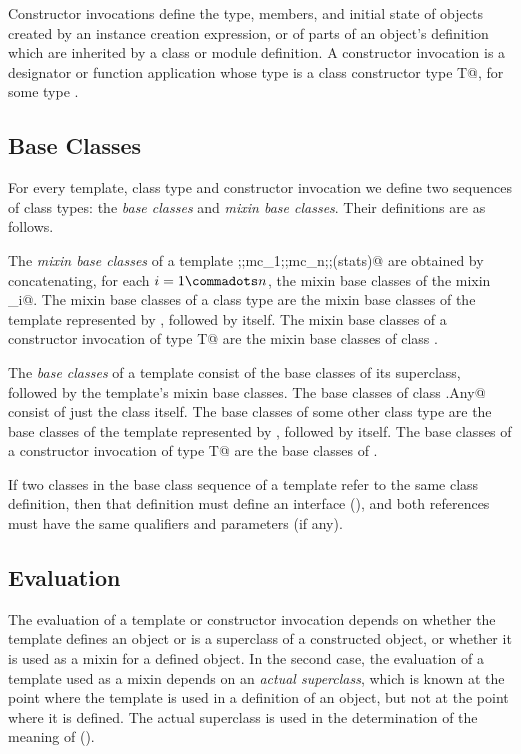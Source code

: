 \documentclass[11pt]{report}
\begin{document}
Constructor invocations define the type, members, and initial state of
objects created by an instance creation expression, or of parts of an
object's definition which are inherited by a class or module
definition. A constructor invocation is a designator or function
application whose type is a class constructor type \verb@class T@, for
some type \verb@T@.

\subsection{Base Classes}
\label{sec:base-classes}

For every template, class type and constructor invocation we define two
sequences of class types: the {\em base classes} and {\em mixin base
classes}. Their definitions are as follows.

The {\em mixin base classes} of a template
\verb@sc;\WITH;mc_1;\WITH;mc_n;\WITH;(stats)@ are obtained by
concatenating, for each $i = 1 \commadots n$, the mixin base classes
of the mixin \verb@mc_i@. The mixin base classes of a class type \verb@C@ are
the mixin base classes of the template represented by \verb@C@, followed by
\verb@C@ itself. The mixin base classes of a constructor invocation of type
\verb@class T@ are the mixin base classes of class \verb@T@.

The {\em base classes} of a template consist of the base classes of
its superclass, followed by the template's mixin base classes.  The
base classes of class \verb@scala.Any@ consist of just the
class itself. The base classes of some other class type \verb@C@ are the
base classes of the template represented by \verb@C@, followed by \verb@C@
itself.  The base classes of a constructor invocation of type \verb@class T@
are the base classes of \verb@T@.

If two classes in the base class sequence of a template refer to the
same class definition, then that definition must define an interface
(), and both references must have the same
qualifiers and parameters (if any).

\subsection{Evaluation}

The evaluation of a template or constructor invocation depends on
whether the template defines an object or is a superclass of a
constructed object, or whether it is used as a mixin for a defined
object.  In the second case, the evaluation of a template used as a
mixin depends on an {\em actual superclass}, which is known at the
point where the template is used in a definition of an object, but not
at the point where it is defined. The actual superclass is used in the
determination of the meaning of \verb@super@ ().
\end{document}
